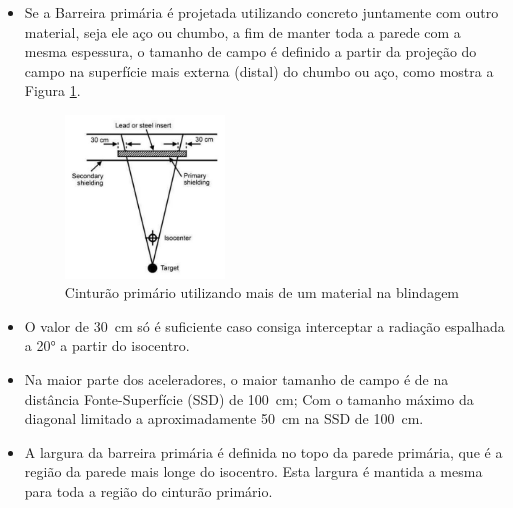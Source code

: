 \documentclass[11pt,a4paper]{article}
\begin{document}
\begin{itemize}
                
                \item Se a Barreira primária é projetada utilizando concreto juntamente com outro material, seja ele aço ou chumbo, a fim de manter toda a parede com a mesma espessura, o tamanho de campo é definido a partir da projeção do campo na superfície mais externa (distal) do chumbo ou aço, como mostra a Figura \ref{fig:esquemaCinturaoPrimarioDoisMateriaisDeBlindagem}.
                    
                    \begin{figure}[h]
                        \centering
                        \includegraphics[width=0.4\textwidth]{Imagens/esquemaCinturaoPrimarioDoisMateriaisDeBlindagem.JPG}
                        \caption{Cinturão primário utilizando mais de um material na blindagem}
                        \label{fig:esquemaCinturaoPrimarioDoisMateriaisDeBlindagem}
                    \end{figure}
                
                \item O valor de \qty{30}{cm} só é suficiente caso consiga interceptar a radiação espalhada a \ang{20} a partir do isocentro. 
                
                \item Na maior parte dos aceleradores, o maior tamanho de campo é de  na distância Fonte-Superfície (SSD) de \qty{100}{cm}; Com o tamanho máximo da diagonal limitado a aproximadamente \qty{50}{cm} na SSD de \qty{100}{cm}. 
                
                \item A largura da barreira primária é definida no topo da parede primária, que é a região da parede mais longe do isocentro. Esta largura é mantida a mesma para toda a região do cinturão primário.
                
            \end{itemize}
\end{document}
